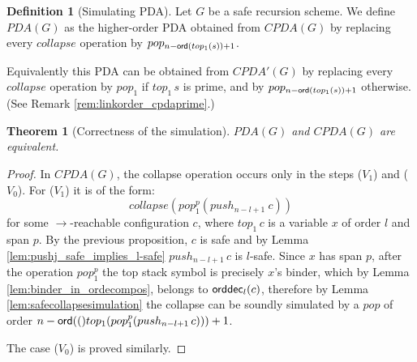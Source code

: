 \documentclass[a4paper,draft]{article}
\newtheorem{theorem}{Theorem}[section]
\theoremstyle{remark}
\theoremstyle{definition}
\newtheorem{definition}{Definition}[section]
\newcommand\orddec{{\sf orddec}}
\begin{document}
\begin{definition}[Simulating PDA]
Let $G$ be a safe recursion scheme.
We define $PDA(G)$ as the higher-order PDA obtained from
$CPDA(G)$ by replacing 
every $collapse$ operation by $pop_{n-{\sf ord}(top_1(s))+1}$.
\end{definition}
Equivalently this PDA can be obtained from $CPDA'(G)$ by replacing 
every $collapse$ operation by $pop_1$ if $top_1\, s$ is prime, and by $pop_{n-{\sf ord}(top_1(s))+1}$ otherwise. (See Remark \ref{rem:linkorder_cpdaprime}.)
\begin{theorem}[Correctness of the simulation]
$PDA(G)$ and $CPDA(G)$ are equivalent.
\end{theorem}
\begin{proof}
In $CPDA(G)$, the collapse operation occurs only in the steps ($V_1$) and ($V_0$). For ($V_1$) it is of the form:
$$collapse(pop_1^p(push_{n-l+1}~c))$$
for some $\rightarrow$-reachable configuration $c$, where $top_1\,c$ is a variable $x$ of order $l$ and span $p$.
By the previous proposition, $c$ is safe and by Lemma \ref{lem:pushj_safe_implies_l-safe} $push_{n-l+1}\, c$ is $l$-safe. Since $x$ has span $p$, after the operation $pop_1^p$ the top stack symbol is precisely $x$'s binder, which by Lemma \ref{lem:binder_in_ordecompos}, belongs to $\orddec_l(c)$, therefore
by Lemma \ref{lem:safecollapsesimulation} the collapse can be soundly simulated by a $pop$ of order
$n-{\sf ord}(()top_1(pop_1^p(push_{n-l+1}\,c))) +1$.

The case ($V_0$) is proved similarly.
\end{proof}



\end{document}
